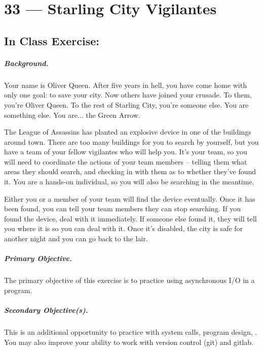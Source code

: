 \documentclass[a4paper]{report}
\begin{document}
\chapter*{33 --- Starling City Vigilantes}


\section*{In Class Exercise: }

\paragraph{Background.}
Your name is Oliver Queen. After five years in hell, you have come home with only one goal: to save your city. Now others have joined your crusade. To them, you're Oliver Queen. To the rest of Starling City, you're someone else. You are something else. You are... the Green Arrow.

The League of Assassins has planted an explosive device in one of the buildings around town. There are too many buildings for you to search by yourself, but you have a team of your fellow vigilantes who will help you. It's your team, so you will need to coordinate the actions of your team members -- telling them what areas they should search, and checking in with them as to whether they've found it. You are a hands-on individual, so you will also be searching in the meantime.

Either you or a member of your team will find the device eventually. Once it has been found, you can tell your team members they can stop searching. If you found the device, deal with it immediately. If someone else found it, they will tell you where it is so you can deal with it. Once it's disabled, the city is safe for another night and you can go back to the lair.


\paragraph{Primary Objective.} The primary objective of this exercise is to practice using asynchronous I/O in a program.

\paragraph{Secondary Objective(s).} This is an additional opportunity to practice with system calls, program design, . You may also improve your ability to work with version control (git) and gitlab.
\end{document}
